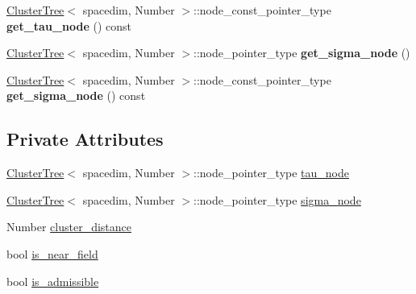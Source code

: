 \begin{DoxyCompactItemize}
\hyperlink{classClusterTree}{Cluster\+Tree}$<$ spacedim, Number $>$\+::node\+\_\+const\+\_\+pointer\+\_\+type {\bfseries get\+\_\+tau\+\_\+node} () const
\item 
\mbox{\label{classBlockCluster_afb94252b60aeb16cba76c682beece9e5}} 
\hyperlink{classClusterTree}{Cluster\+Tree}$<$ spacedim, Number $>$\+::node\+\_\+pointer\+\_\+type {\bfseries get\+\_\+sigma\+\_\+node} ()
\item 
\mbox{\label{classBlockCluster_af5d7b4b0154ec0f5a99c6c3a7119ac52}} 
\hyperlink{classClusterTree}{Cluster\+Tree}$<$ spacedim, Number $>$\+::node\+\_\+const\+\_\+pointer\+\_\+type {\bfseries get\+\_\+sigma\+\_\+node} () const
\end{DoxyCompactItemize}

\subsection*{Private Attributes}
\begin{DoxyCompactItemize}
\item 
\hyperlink{classClusterTree}{Cluster\+Tree}$<$ spacedim, Number $>$\+::node\+\_\+pointer\+\_\+type \hyperlink{classBlockCluster_aac88834478cb4e409596e58100a5e9de}{tau\+\_\+node}
\item 
\hyperlink{classClusterTree}{Cluster\+Tree}$<$ spacedim, Number $>$\+::node\+\_\+pointer\+\_\+type \hyperlink{classBlockCluster_ae1005ec7feedbdb990b27d845b24bad2}{sigma\+\_\+node}
\item 
Number \hyperlink{classBlockCluster_a2b843d0eaae1bf4b49ec82ffcb75e798}{cluster\+\_\+distance}
\item 
bool \hyperlink{classBlockCluster_a6f719cbd6a646328f8128355c857745a}{is\+\_\+near\+\_\+field}
\item 
bool \hyperlink{classBlockCluster_ae85d165894d10b7e58fbe20edd506abe}{is\+\_\+admissible}
\end{DoxyCompactItemize}
